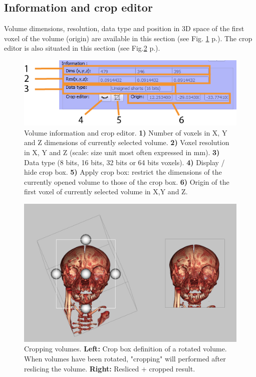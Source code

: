 \subsection{Information and crop editor}
Volume dimensions, resolution, data type and position in 3D space of the first voxel of the volume (origin) are available in this section (see Fig. \ref{volume_information} p.\pageref{volume_information}). The crop editor is also situated in this section (see Fig.\ref{crop_example} p.\pageref{crop_example}). 
\begin{figure}
  \centering
  \includegraphics[scale=1]{images/14/volume_information2.png}
\caption{Volume information and crop editor. \textbf{1)} Number of voxels in X, Y and Z dimensions of currently selected volume.   \textbf{2)} Voxel resolution in X, Y and Z (scale: size unit most often expressed in mm). \textbf{3)} Data type (8 bits, 16 bits, 32 bits or 64 bits voxels).  \textbf{4)} Display / hide crop box. \textbf{5)} Apply crop box: restrict the dimensions of the currently opened volume to those of the crop box. \textbf{6)} Origin of the first voxel of currently selected volume in X,Y and Z. }	
\label{volume_information}
 \end{figure}


\begin{figure}
  \centering
  \includegraphics[scale=0.4]{images/14/crop_example/crop_example.png}
\caption{Cropping volumes. \textbf{Left:} Crop box definition of a rotated volume. When volumes have been rotated, "cropping" will performed after reslicing the volume.   \textbf{Right:} Resliced + cropped result.}	
\label{crop_example}
 \end{figure}

